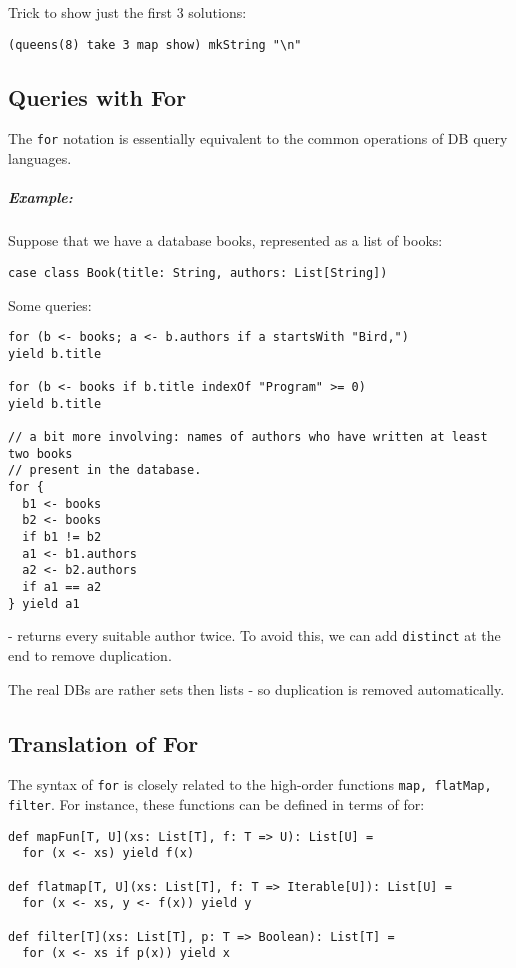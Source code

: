 \documentclass{scrartcl}
\newcommand{\example}{\subparagraph{Example:}} %
\newcommand{\term}[1]{\verb~#1~} %
\begin{document}
Trick to show just the first 3 solutions:
\begin{lstlisting}
(queens(8) take 3 map show) mkString "\n"
\end{lstlisting}

\subsection{Queries with For}
\label{sec:QueriesWithFor}

The \term{for} notation is essentially equivalent to the common operations of
DB query languages.
\example Suppose that we have a database books, represented as a list of books: 
\begin{lstlisting}
case class Book(title: String, authors: List[String])
\end{lstlisting}

Some queries:
\begin{lstlisting}
for (b <- books; a <- b.authors if a startsWith "Bird,") 
yield b.title

for (b <- books if b.title indexOf "Program" >= 0)
yield b.title

// a bit more involving: names of authors who have written at least two books
// present in the database.
for {
  b1 <- books
  b2 <- books
  if b1 != b2
  a1 <- b1.authors
  a2 <- b2.authors
  if a1 == a2
} yield a1
\end{lstlisting}
- returns every suitable author twice. To avoid this, we can add
\lstinline|distinct| at the end to remove duplication.

The real DBs are rather sets then lists - so duplication is removed
automatically. 


\subsection{Translation of For}
\label{sec:TranslationOfFor}

The syntax of \lstinline|for| is closely related to the high-order functions
\lstinline|map, flatMap, filter|. For instance, these functions can be defined
in terms of for:
\begin{lstlisting}
def mapFun[T, U](xs: List[T], f: T => U): List[U] =
  for (x <- xs) yield f(x)

def flatmap[T, U](xs: List[T], f: T => Iterable[U]): List[U] =
  for (x <- xs, y <- f(x)) yield y

def filter[T](xs: List[T], p: T => Boolean): List[T] = 
  for (x <- xs if p(x)) yield x
\end{lstlisting}
\end{document}
